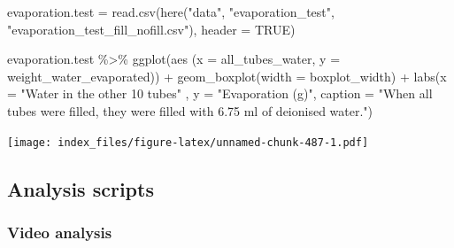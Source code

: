 \documentclass[
]{article}
\newenvironment{Shaded}{\begin{snugshade}}{\end{snugshade}}
\newcommand{\AttributeTok}[1]{\textcolor[rgb]{0.77,0.63,0.00}{#1}}
\newcommand{\ConstantTok}[1]{\textcolor[rgb]{0.00,0.00,0.00}{#1}}
\newcommand{\FunctionTok}[1]{\textcolor[rgb]{0.00,0.00,0.00}{#1}}
\newcommand{\NormalTok}[1]{#1}
\newcommand{\OtherTok}[1]{\textcolor[rgb]{0.56,0.35,0.01}{#1}}
\newcommand{\SpecialCharTok}[1]{\textcolor[rgb]{0.00,0.00,0.00}{#1}}
\newcommand{\StringTok}[1]{\textcolor[rgb]{0.31,0.60,0.02}{#1}}
\begin{document}
\begin{Shaded}
\begin{Highlighting}[]
\NormalTok{evaporation.test }\OtherTok{=} \FunctionTok{read.csv}\NormalTok{(}\FunctionTok{here}\NormalTok{(}\StringTok{"data"}\NormalTok{, }\StringTok{"evaporation\_test"}\NormalTok{, }\StringTok{"evaporation\_test\_fill\_nofill.csv"}\NormalTok{), }\AttributeTok{header =} \ConstantTok{TRUE}\NormalTok{)}

\NormalTok{evaporation.test }\SpecialCharTok{\%\textgreater{}\%}
  \FunctionTok{ggplot}\NormalTok{(}\FunctionTok{aes}\NormalTok{ (}\AttributeTok{x =}\NormalTok{ all\_tubes\_water,}
              \AttributeTok{y =}\NormalTok{ weight\_water\_evaporated)) }\SpecialCharTok{+}
  \FunctionTok{geom\_boxplot}\NormalTok{(}\AttributeTok{width =}\NormalTok{ boxplot\_width) }\SpecialCharTok{+}
  \FunctionTok{labs}\NormalTok{(}\AttributeTok{x =} \StringTok{"Water in the other 10 tubes"}\NormalTok{ , }
  \AttributeTok{y =} \StringTok{"Evaporation (g)"}\NormalTok{, }
  \AttributeTok{caption =} \StringTok{"When all tubes were filled, they were filled with 6.75 ml of deionised water."}\NormalTok{)}
\end{Highlighting}
\end{Shaded}

\texttt{[image: index\_files/figure-latex/unnamed-chunk-487-1.pdf]}

\hypertarget{analysis-scripts}{%
\subsection{Analysis scripts}\label{analysis-scripts}}

\hypertarget{video-analysis}{%
\subsubsection{Video analysis}\label{video-analysis}}
\end{document}
